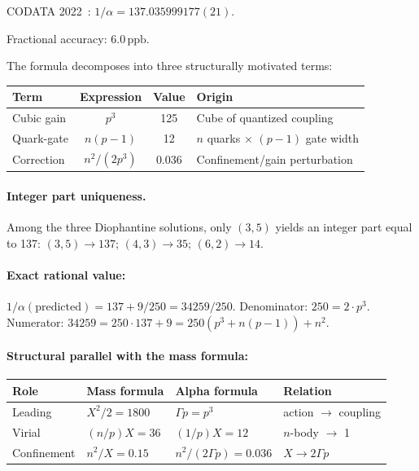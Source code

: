 \documentclass[12pt,a4paper]{article}
\theoremstyle{definition}
\newcommand{\ppb}{\,\mathrm{ppb}}
\begin{document}
CODATA 2022~\cite{codata2022}: $1/\alpha = 137.035999177(21)$.

Fractional accuracy: $6.0\ppb$.

The formula decomposes into three structurally motivated terms:

\begin{center}
\begin{tabular}{lccl}
\toprule
Term & Expression & Value & Origin \\
\midrule
Cubic gain   & $p^3$        & 125   & Cube of quantized coupling \\
Quark-gate   & $n(p-1)$     &  12   & $n$ quarks $\times$ $(p-1)$ gate width \\
Correction   & $n^2/(2p^3)$ & 0.036 & Confinement/gain perturbation \\
\bottomrule
\end{tabular}
\end{center}

\paragraph{Integer part uniqueness.}
Among the three Diophantine solutions, only $(3,5)$ yields an integer part
equal to 137: $(3,5) \to 137$; $(4,3) \to 35$; $(6,2) \to 14$.

\paragraph{Exact rational value:}
$1/\alpha(\text{predicted}) = 137 + 9/250 = 34259/250$.
Denominator: $250 = 2 \cdot p^3$. Numerator:
$34259 = 250 \cdot 137 + 9 = 250(p^3 + n(p-1)) + n^2$.

\paragraph{Structural parallel with the mass formula:}
\begin{center}
\begin{tabular}{llll}
\toprule
Role & Mass formula & Alpha formula & Relation \\
\midrule
Leading     & $X^2/2 = 1800$  & $\Gamma p = p^3$    & action $\to$ coupling \\
Virial      & $(n/p)X = 36$   & $(1/p)X = 12$       & $n$-body $\to$ 1 \\
Confinement & $n^2/X = 0.15$  & $n^2/(2\Gamma p) = 0.036$ & $X \to 2\Gamma p$ \\
\bottomrule
\end{tabular}
\end{center}
\end{document}
